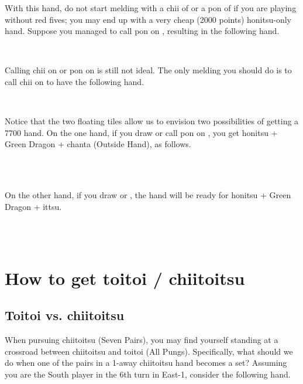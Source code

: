 \bigskip
\noindent With this hand, do not start melding with a {\jap chii} of {\LARGE{}} or a {\jap pon} of {\LARGE\bei} if you are playing without red fives; you may end up with a very cheap (2000 points) {\jap honitsu}-only hand.
Suppose you managed to call {\jap pon} on {\LARGE\fa}, resulting in the following hand.

\bp
{}\xi\bei\bei~\fa\rfa\fa
\ep

\noindent Calling {\jap chii} on {\LARGE{}} or {\jap pon} on {\LARGE\bei} is still not ideal. The only melding you should do is to call {\jap chii} on {\LARGE{}} to have the following hand.

\bp
{}\xi\bei\bei~~\fa\rfa\fa
\ep

Notice that the two floating tiles {\LARGE{} \xi} allow us to envision two possibilities of getting a 7700 hand.
On the one hand, if you draw {\LARGE\xi} or call {\jap pon} on {\LARGE\bei}, you get {\jap honitsu} + Green Dragon + {\jap chanta} (Outside Hand), as follows.

\bp
{}\xi\xi\bei\bei~~\fa\rfa\fa\\
\xi~\bei\bei\rbei~~\fa\rfa\fa
\ep

On the other hand, if you draw {\LARGE{}} or {\LARGE{}}, the hand will be ready for {\jap honitsu} + Green Dragon + {\jap ittsu}.

\bp
{}\bei\bei~~\fa\rfa\fa\\
\bei\bei~~\fa\rfa\fa
\ep

\newpage
\section{How to get {\jap toitoi} / {\jap chiitoitsu}} \label{sec:toi}

\subsection{{\jap Toitoi} vs. {\jap chiitoitsu}}
When pursuing {\jap chiitoitsu} (Seven Pairs), you may find yourself standing at a crossroad between {\jap chiitoitsu} and {\jap toitoi} (All Pungs). Specifically, what should we do when one of the pairs in a 1-away {\jap chiitoitsu} hand becomes a set? Assuming you are the South player in the 6th turn in East-1, consider the following hand.

